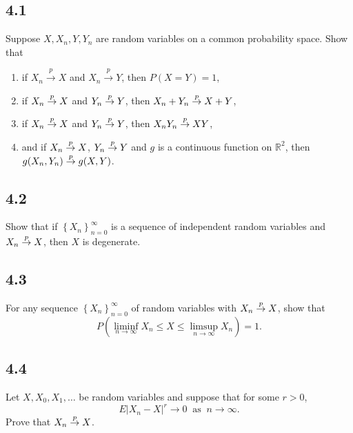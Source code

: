 \documentclass[12pt]{article}
\begin{document}
\newpage
\subsection*{4.1}
\begin{tcolorbox}
Suppose $X, X_{n}, Y, Y_{n}$ are random variables on a common probability space. Show that
\begin{enumerate}[label=(\alph*)]
\item if $X_{n} \stackrel{p}{\rightarrow} X$ and $X_{n}\stackrel{p}{\rightarrow}Y$, then $P(X = Y) = 1$,
\item if $X_{n}\stackrel{p}{\rightarrow} X$ and $Y_{n} \stackrel{p}{\rightarrow} Y$, then $X_{n} + Y_{n} \stackrel{p}{\rightarrow} X + Y$,
\item if $X_{n}\stackrel{p}{\rightarrow} X$ and $Y_{n}\stackrel{p}{\rightarrow} Y$, then $X_{n}Y_{n}\stackrel{p}{\rightarrow} XY$, 
\item and if $X_{n}\stackrel{p}{\rightarrow} X$, $Y_{n}\stackrel{p}{\rightarrow} Y$ and $g$ is a continuous function on $\mathbb{R}^{2}$, then $g(X_{n},Y_{n})\stackrel{p}{\rightarrow} g(X,Y)$.
\end{enumerate}
\end{tcolorbox}

\subsection*{4.2}
\begin{tcolorbox}
Show that if $\left\{ X_{n} \right\}_{n=0}^{\infty}$ is a sequence of independent random variables and $X_{n} \stackrel{p}{\rightarrow} X$, then $X$ is degenerate.
\end{tcolorbox}


\subsection*{4.3}
\begin{tcolorbox}
For any sequence $\left\{ X_{n} \right\}_{n=0}^{\infty}$ of random variables with $X_{n}\stackrel{p}{\rightarrow} X$, show that 
\[ P\left(\liminf_{n\rightarrow\infty}X_{n}\leq X\leq \limsup_{n\rightarrow\infty}X_{n}\right) = 1. \]
\end{tcolorbox}

\subsection*{4.4}
\begin{tcolorbox}
Let $X, X_{0}, X_{1}, \hdots$ be random variables and suppose that for some $r > 0$,
\[ E|X_{n} - X|^{r} \rightarrow 0 \ \text{ as } \ n \rightarrow \infty. \]
Prove that $X_{n}\stackrel{p}{\rightarrow} X$.
\end{tcolorbox}
\end{document}
